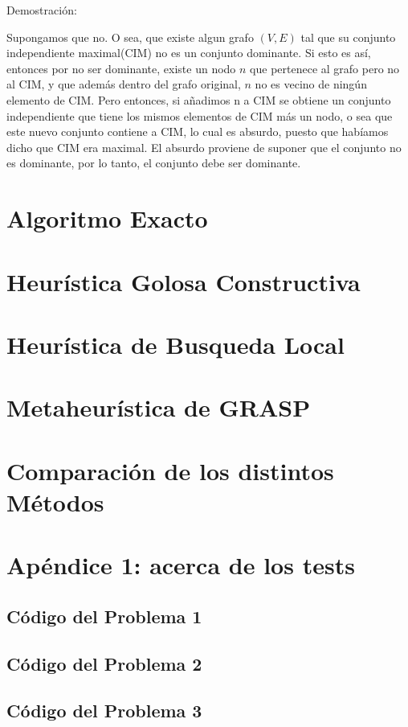 \documentclass[a4paper]{article}
\begin{document}
Demostración:

Supongamos que no. O sea, que existe algun grafo $(V,E)$ tal que su conjunto independiente maximal(CIM) no es un conjunto dominante. Si esto es así, entonces por no ser dominante, existe un nodo $n$ que pertenece al grafo pero no al CIM, y que además dentro del grafo original, $n$ no es vecino de ningún elemento de CIM. Pero entonces, si añadimos n a CIM se obtiene un conjunto independiente que tiene los mismos elementos de CIM más un nodo, o sea que este nuevo conjunto contiene a CIM, lo cual es absurdo, puesto que habíamos dicho que CIM era maximal. El absurdo proviene de suponer que el conjunto no es dominante, por lo tanto, el conjunto debe ser dominante.

\section{Algoritmo Exacto}


\newpage
\section{Heurística Golosa Constructiva}


\newpage
\section{Heurística de Busqueda Local}


\newpage
\section{Metaheurística de GRASP}


\newpage
\section{Comparación de los distintos Métodos}


\newpage
\section{Apéndice 1: acerca de los tests}


\subsection{Código del Problema 1}

\subsection{Código del Problema 2}



\subsection{Código del Problema 3}
\end{document}
